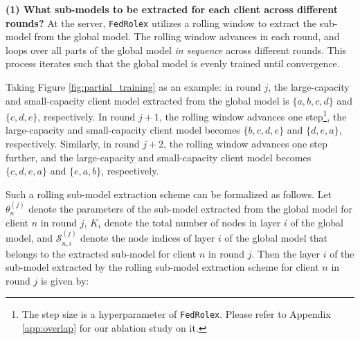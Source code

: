 \documentclass{article}
\begin{document}
 

\textbf{(1) What sub-models to be extracted for each client across different rounds?} 
%
At the server, \texttt{FedRolex} utilizes a rolling window to extract the sub-model from the global model. The rolling window advances in each round, and loops over all parts of the global model \textit{in sequence} across different rounds. This process iterates such that the global model is evenly trained until convergence.

Taking Figure \ref{fig:partial_training} as an example: in round $j$, the large-capacity and small-capacity client model extracted from the global model is $\{a, b, c, d\}$ and $\{c, d, e\}$, respectively. In round $j+1$, the rolling window advances one step\footnote{The step size is a hyperparameter of \texttt{FedRolex}. Please refer to Appendix \ref{app:overlap} for our ablation study on it.}, the large-capacity and small-capacity client model becomes $\{b, c, d, e\}$ and $\{d, e, a\}$, respectively. Similarly, in round $j+2$, the rolling window advances one step further, and the large-capacity and small-capacity client model becomes $\{c, d, e, a\}$ and $\{e, a, b\}$, respectively.
%


Such a rolling sub-model extraction scheme can be formalized as follows.
Let $\theta^{(j)}_n$ denote the parameters of the sub-model extracted from the global model for client $n$ in round $j$, $K_i$ denote the total number of nodes in layer $i$ of the global model, and $\mathcal{S}^{(j)}_{n, i}$ denote the node indices of layer $i$ of the global model that belongs to the extracted sub-model for client $n$ in round $j$. Then the layer $i$ of the sub-model extracted by the rolling sub-model extraction scheme for client $n$ in round $j$ is given by:
\end{document}
